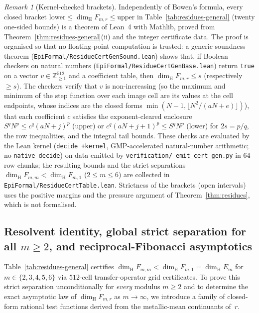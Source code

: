 \documentclass[11pt]{article}
\theoremstyle{definition}
\theoremstyle{remark}
\newtheorem{remark}[theorem]{Remark}
\newcommand{\Z}{\mathbb{Z}}
\newcommand{\dimH}{\dim_{\mathrm{H}}}
\begin{document}
\begin{remark}[Kernel-checked brackets]\label{rem:residue-kernel}
Independently of Bowen's formula, every closed bracket
$\mathrm{lower}\le\dimH F_{m,r}\le\mathrm{upper}$ in Table~\ref{tab:residues-general}
(twenty one-sided bounds) is a theorem of Lean~4 with Mathlib, proved from
Theorem~\ref{thm:residues-general}(ii) and the integer certificate data. The proof is
organised so that no floating-point computation is trusted: a generic soundness theorem
(\texttt{EpiFormal/\allowbreak ResidueCertGenSound.lean}) shows that, if Boolean checkers on
natural numbers (\texttt{EpiFormal/\allowbreak ResidueCertGenBase.lean}) return \texttt{true}
on a vector $v\in\Z_{\ge1}^{512}$ and a coefficient table, then $\dimH F_{m,r}\le s$
(respectively $\ge s$). The checkers verify that $v$ is non-increasing (so the maximum and
minimum of the step function over each image cell are its values at the cell endpoints,
whose indices are the closed forms $\min(N-1,\lfloor N^2/(aN+e)\rfloor)$), that each
coefficient $c$ satisfies the exponent-cleared enclosure
$S^qN^p\le c^q(aN+j)^p$ (upper) or $c^q(aN+j+1)^p\le S^qN^p$ (lower) for $2s=p/q$, the
row inequalities, and the integral tail bounds. These checks are evaluated by the Lean
kernel (\texttt{decide +kernel}, GMP-accelerated natural-number arithmetic; no
\texttt{native\_decide}) on data emitted by \texttt{verification/\allowbreak
emit\_cert\_gen.py} in $64$-row chunks; the resulting bounds and the strict separations
$\dimH F_{m,m}<\dimH F_{m,1}$ ($2\le m\le6$) are collected in
\texttt{EpiFormal/\allowbreak ResidueCertTable.lean}. Strictness of the brackets
(open intervals) uses the positive margins and the pressure argument of
Theorem~\ref{thm:residues}, which is not formalised.
\end{remark}


\subsection{Resolvent identity, global strict separation for all \texorpdfstring{$m\ge2$}{m >= 2}, and reciprocal-Fibonacci asymptotics}\label{sec:residues-asymptotic}

Table~\ref{tab:residues-general} certifies $\dimH F_{m,m}<\dimH F_{m,1}=\dimH E_m$
for $m\in\{2,3,4,5,6\}$ via $512$-cell transfer-operator grid certificates. To
prove this strict separation unconditionally for \emph{every} modulus $m\ge2$ and
to determine the exact asymptotic law of $\dimH F_{m,r}$ as $m\to\infty$, we
introduce a family of closed-form rational test functions derived from the
metallic-mean continuants of~$r$.
\end{document}
